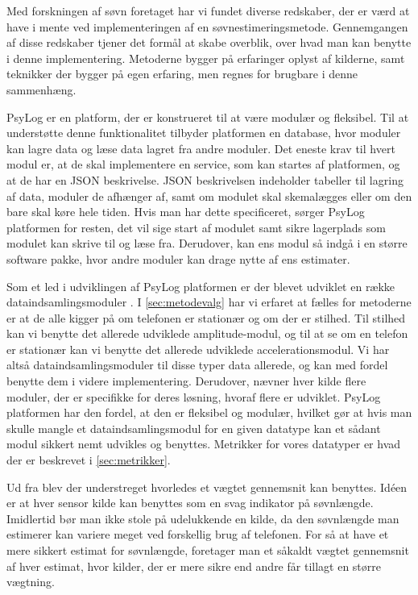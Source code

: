 Med forskningen af søvn foretaget har vi fundet diverse redskaber, der er værd at have i mente ved implementeringen af en søvnestimeringsmetode.
Gennemgangen af disse redskaber tjener det formål at skabe overblik, over hvad man kan benytte i denne implementering.
Metoderne bygger på erfaringer oplyst af kilderne, samt teknikker der bygger på egen erfaring, men regnes for brugbare i denne sammenhæng.

\begin{description}[style=nextline]
\item[PsyLog]
PsyLog er en platform, der er konstrueret til at være modulær og fleksibel.
Til at understøtte denne funktionalitet tilbyder platformen en database, hvor moduler kan lagre data og læse data lagret fra andre moduler.
Det eneste krav til hvert modul er, at de skal implementere en service, som kan startes af platformen, og at de har en JSON beskrivelse.
JSON beskrivelsen indeholder tabeller til lagring af data, moduler de afhænger af, samt om modulet skal skemalægges eller om den bare skal køre hele tiden.
Hvis man har dette specificeret, sørger PsyLog platformen for resten, det vil sige start af modulet samt sikre lagerplads som modulet kan skrive til og læse fra.
Derudover, kan ens modul så indgå i en større software pakke, hvor andre moduler kan drage nytte af ens estimater.

\item[Dataindsamlingsmoduler]
Som et led i udviklingen af PsyLog platformen er der blevet udviklet en række dataindsamlingsmoduler \citep{misc:faellesrapp}.
I \cref{sec:metodevalg} har vi erfaret at fælles for metoderne er at de alle kigger på om telefonen er stationær og om der er stilhed. 
Til stilhed kan vi benytte det allerede udviklede amplitude-modul, og til at se om en telefon er stationær kan vi benytte det allerede udviklede accelerationsmodul.
Vi har altså dataindsamlingsmoduler til disse typer data allerede, og kan med fordel benytte dem i videre implementering.
Derudover, nævner hver kilde flere moduler, der er specifikke for deres løsning, hvoraf flere er udviklet.
PsyLog platformen har den fordel, at den er fleksibel og modulær, hvilket gør at hvis man skulle mangle et dataindsamlingsmodul for en given datatype kan et sådant modul sikkert nemt udvikles og benyttes.
Metrikker for vores datatyper er hvad der er beskrevet i \cref{sec:metrikker}.

\item[Vægtet gennemsnit]
Ud fra \citet{6563918} blev der understreget hvorledes et vægtet gennemsnit kan benyttes.
Idéen er at hver sensor kilde kan benyttes som en svag indikator på søvnlængde.
Imidlertid bør man ikke stole på udelukkende en kilde, da den søvnlængde man estimerer kan variere meget ved forskellig brug af telefonen.
For så at have et mere sikkert estimat for søvnlængde, foretager man et såkaldt vægtet gennemsnit af hver estimat, hvor kilder, der er mere sikre end andre får tillagt en større vægtning.


\end{description}

